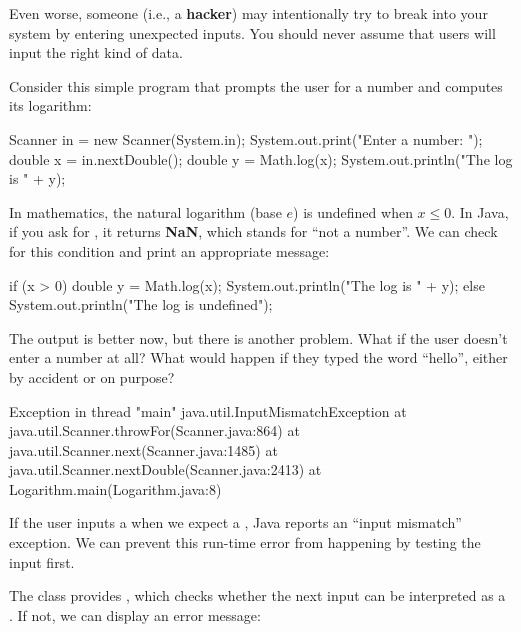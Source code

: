 Even worse, someone (i.e., a {\bf hacker}) may intentionally try to break into your system by entering unexpected inputs.
You should never assume that users will input the right kind of data.

Consider this simple program that prompts the user for a number and computes its logarithm:

\begin{code}
Scanner in = new Scanner(System.in);
System.out.print("Enter a number: ");
double x = in.nextDouble();
double y = Math.log(x);
System.out.println("The log is " + y);
\end{code}

In mathematics, the natural logarithm (base $e$) is undefined when $x \le 0$.
In Java, if you ask for , it returns {\bf NaN}, which stands for ``not a number''.
We can check for this condition and print an appropriate message:

\begin{code}
if (x > 0) {
    double y = Math.log(x);
    System.out.println("The log is " + y);
} else {
    System.out.println("The log is undefined");
}
\end{code}

The output is better now, but there is another problem.
What if the user doesn't enter a number at all?
What would happen if they typed the word ``hello'', either by accident or on purpose?


\begin{small}
\begin{stdout}
Exception in thread "main" java.util.InputMismatchException
    at java.util.Scanner.throwFor(Scanner.java:864)
    at java.util.Scanner.next(Scanner.java:1485)
    at java.util.Scanner.nextDouble(Scanner.java:2413)
    at Logarithm.main(Logarithm.java:8)
\end{stdout}
\end{small}


If the user inputs a  when we expect a , Java reports an ``input mismatch'' exception.
We can prevent this run-time error from happening by testing the input first.

The  class provides , which checks whether the next input can be interpreted as a .
If not, we can display an error message:

